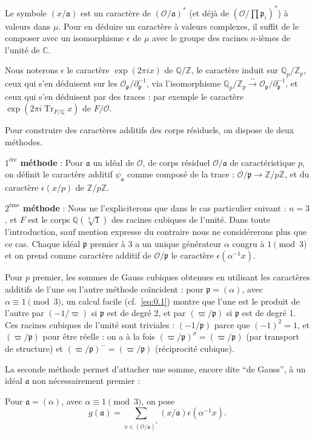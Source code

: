 \documentclass[12pt,a4paper]{article}
\theoremstyle{plain}
\theoremstyle{definition}
\theoremstyle{remark}
\DeclareMathOperator{\Tr}{Tr}
\newcommand{\CC}{\mathbb{C}}
\newcommand{\QQ}{\mathbb{Q}}
\newcommand{\ZZ}{\mathbb{Z}}
\newcommand{\cO}{\mathcal{O}}
\newcommand{\frakp}{\mathfrak{p}}
\newcommand{\fraka}{\mathfrak{a}}
\providecommand{\CC}{\mathbb{C}}
\providecommand{\QQ}{\mathbb{Q}}
\providecommand{\ZZ}{\mathbb{Z}}
\providecommand{\cO}{\mathcal{O}}
\providecommand{\fraka}{\mathfrak{a}}
\providecommand{\frakp}{\mathfrak{p}}
\providecommand{\Tr}{\operatorname{Tr}}
\begin{document}
Le symbole $(x/\fraka)$ est un caractère de $(\cO/\fraka)^*$ (et déjà de $(\cO/\prod \frakp_i)^*$) à valeurs dans $\mu$. Pour en déduire un caractère à valeurs complexes, il suffit de le composer avec un isomorphisme $\epsilon$ de $\mu$ avec le groupe des racines $n$-ièmes de l'unité de $\CC$.

Nous noterons $\epsilon$ le caractère $\exp(2\pi i x)$ de $\QQ/\ZZ$, le caractère induit sur $\QQ_p/\ZZ_p$, ceux qui s'en déduisent sur les $\cO_{\frakp}/\partial_{\frakp}^{-1}$, via l'isomorphisme $\QQ_p/\ZZ_p \xrightarrow{\sim} \cO_{\frakp}/\partial_{\frakp}^{-1}$, et ceux qui s'en déduisent par des traces : par exemple le caractère $\exp(2\pi i \Tr_{F/\QQ} x)$ de $F/\cO$.

Pour construire des caractères additifs des corps résiduels, on dispose de deux méthodes.

\textbf{$1^{\text{ère}}$ méthode} : Pour $\fraka$ un idéal de $\cO$, de corps résiduel $\cO/\fraka$ de caractéristique $p$, on définit le caractère additif $\psi_{\fraka}$ comme composé de la trace : $\cO/\frakp \to \ZZ/p\ZZ$, et du caractère $\epsilon(x/p)$ de $\ZZ/p\ZZ$.

\textbf{$2^{\text{ème}}$ méthode} : Nous ne l'expliciterons que dans le cas particulier suivant : $n = 3$, et $F$ est le corps $\QQ(\sqrt[3]{1})$ des racines cubiques de l'unité. Dans toute l'introduction, sauf mention expresse du contraire nous ne considérerons plus que ce cas. Chaque idéal $\frakp$ premier à $3$ a un unique générateur $\alpha$ congru à $1 \pmod 3$ et on prend comme caractère additif de $\cO/\frakp$ le caractère $\epsilon(\alpha^{-1} x)$.

Pour $p$ premier, les sommes de Gauss cubiques obtenues en utilisant les caractères additifs de l'une ou l'autre méthode coïncident : pour $\frakp = (\alpha)$, avec $\alpha \equiv 1 \pmod 3$, un calcul facile (cf.\ \eqref{eq:0.1}) montre que l'une est le produit de l'autre par $(-1/\varpi)$ si $\frakp$ est de degré 2, et par $(\varpi/\frakp)$ si $\frakp$ est de degré 1. Ces racines cubiques de l'unité sont triviales : $(-1/\frakp)$ parce que $(-1)^2 = 1$, et $(\varpi/\frakp)$ pour être réelle : on a à la fois $(\varpi/\frakp)^\sigma = (\varpi/\frakp)$ (par transport de structure) et $(\varpi/\frakp)^- = (\varpi/\frakp)$ (réciprocité cubique).

La seconde méthode permet d'attacher une somme, encore dite ``de Gauss'', à un idéal $\fraka$ non nécessairement premier :

Pour $\fraka = (\alpha)$, avec $\alpha \equiv 1 \pmod 3$, on pose
\begin{equation}\label{eq:0.2}
g(\fraka) = \sum_{x \in (\cO/\fraka)^*} (x/\fraka) \epsilon(\alpha^{-1} x).
\tag{0.2}
\end{equation}
\end{document}
